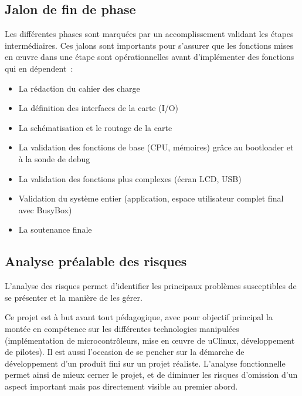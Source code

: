     \subsection{Jalon de fin de phase}
    	Les différentes phases sont marquées par un accomplissement validant les étapes intermédiaires.
        Ces jalons sont importants pour s'assurer que les fonctions mises en \oe uvre dans une étape sont opérationnelles avant d'implémenter des fonctions qui en dépendent~:
    	\begin{itemize}
      		\item La rédaction du cahier des charge
            \item La définition des interfaces de la carte (I/O)
            \item La schématisation et le routage de la carte
            \item La validation des fonctions de base (CPU, mémoires) grâce au bootloader et à la sonde de debug
            \item La validation des fonctions plus complexes (écran LCD, USB)
            \item Validation du système entier (application, espace utilisateur complet final avec BusyBox)
            \item La soutenance finale
      	\end{itemize}
      
    \subsection{Analyse préalable des risques}
    	L'analyse des risques permet d'identifier les principaux problèmes susceptibles de se présenter et la manière de les gérer.
    	
        
        
	Ce projet est à but avant tout pédagogique, avec pour objectif principal la montée en compétence sur les différentes technologies manipulées (implémentation de microcontrôleurs, mise en \oe uvre de uClinux, développement de pilotes).
    Il est aussi l'occasion de se pencher sur la démarche de développement d'un produit fini sur un projet réaliste.
    L'analyse fonctionnelle permet ainsi de mieux cerner le projet, et de diminuer les risques d'omission d'un aspect important mais pas directement visible au premier abord.

